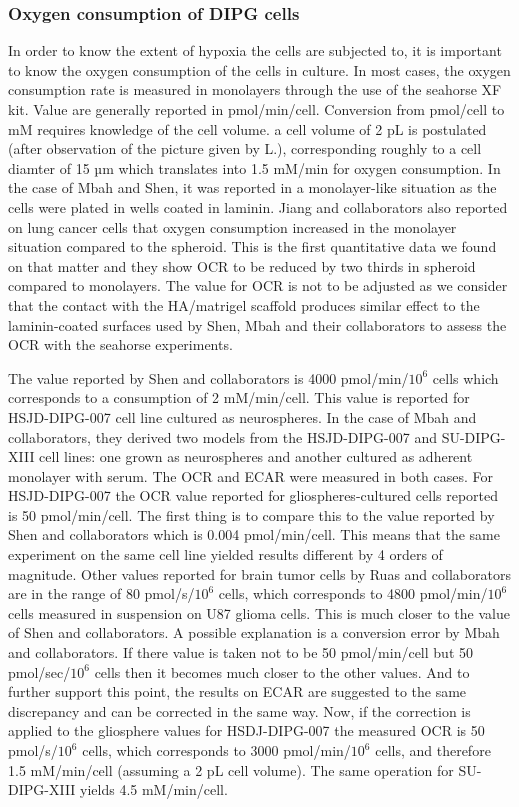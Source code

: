 \documentclass[11pt,a4paper]{article}
\begin{document}
\subsubsection{Oxygen consumption of DIPG cells}
In order to know the extent of hypoxia the cells are subjected to, it is important to know the oxygen consumption of the cells in culture. In most cases, the oxygen consumption rate is measured in monolayers through the use of the seahorse XF kit.\cite{RomeroAgilent} Value are generally reported in pmol/min/cell. Conversion from pmol/cell to mM requires knowledge of the cell volume. a cell volume of 2 pL is postulated (after observation of the picture given by L.), corresponding roughly to a cell diamter of 15 µm which translates into 1.5 mM/min for oxygen consumption. In the case of Mbah and Shen, it was reported in a monolayer-like situation as the cells were plated in wells coated in laminin.  Jiang and collaborators also reported on lung cancer cells that oxygen consumption increased in the monolayer situation compared to the spheroid. This is the first quantitative data we found on that matter and they show OCR to be reduced by two thirds in spheroid compared to monolayers.\cite{Jiang2016} The value for OCR is not to be adjusted as we consider that the contact with the HA/matrigel scaffold produces similar effect to the laminin-coated surfaces used by Shen, Mbah and their collaborators to assess the OCR with the seahorse experiments.

The value reported by Shen and collaborators is 4000 pmol/min/$10^6$ cells which corresponds to a consumption of 2 mM/min/cell. This value is reported for HSJD-DIPG-007 cell line cultured as neurospheres.\cite{Shen2019} In the case of Mbah and collaborators, they derived two models from the HSJD-DIPG-007 and SU-DIPG-XIII cell lines: one grown as neurospheres and another cultured as adherent monolayer with serum. The OCR and ECAR were measured in both cases. For HSJD-DIPG-007 the OCR value reported for gliospheres-cultured cells reported is 50 pmol/min/cell. The first thing is to compare this to the value reported by Shen and collaborators which is 0.004 pmol/min/cell. This means that the same experiment on the same cell line yielded results different by 4 orders of magnitude. Other values reported for brain tumor cells by Ruas and collaborators are in the range of 80 pmol/s/$10^6$ cells, which corresponds to 4800 pmol/min/$10^6$ cells measured in suspension on U87 glioma cells. This is much closer to the value of Shen and collaborators. A possible explanation is a conversion error by Mbah and collaborators. If there value is taken not to be 50 pmol/min/cell but 50 pmol/sec/$10^6$ cells then it becomes much closer to the other values. And to further support this point, the results on ECAR are suggested to the same discrepancy and can be corrected in the same way. Now, if the correction is applied to the gliosphere values for HSDJ-DIPG-007 the measured OCR is 50 pmol/s/$10^6$ cells, which corresponds to 3000 pmol/min/$10^6$ cells, and therefore 1.5 mM/min/cell (assuming a 2 pL cell volume). The same operation for SU-DIPG-XIII yields 4.5 mM/min/cell.
\end{document}
